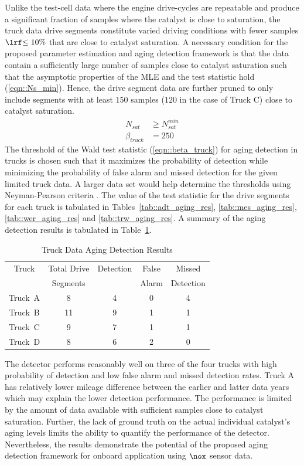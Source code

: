 Unlike the test-cell data where the engine drive-cycles are repeatable and produce a significant fraction of samples where the catalyst is close to saturation, the truck data drive segments constitute varied driving conditions with fewer samples $\lrf{\leq 10\%}$ that are close to catalyst saturation. A necessary condition for the proposed parameter estimation and aging detection framework is that the data contain a sufficiently large number of samples close to catalyst saturation such that the asymptotic properties of the MLE and the test statistic hold (\ref{eqn::Ns_min}). Hence, the drive segment data are further pruned to only include segments with at least $150$ samples ($120$ in the case of Truck C) close to catalyst saturation.
\begin{align}
        N_{sat} &\geq N_{sat}^{min} \label{eqn::Ns_min} \\
        \beta_{truck} &= 250 \label{eqn::beta_truck}
\end{align}
The threshold of the Wald test statistic (\ref{eqn::beta_truck}) for aging detection in trucks is chosen such that it maximizes the probability of detection while minimizing the probability of false alarm and missed detection for the given limited truck data. A larger data set would help determine the thresholds using Neyman-Pearson criteria \citep{kay1998detection}. The value of the test statistic for the drive segments for each truck is tabulated in Tables~\ref{tab::adt_aging_res}, \ref{tab::mes_aging_res}, \ref{tab::wer_aging_res} and \ref{tab::trw_aging_res}. A summary of the aging detection results is tabulated in Table~\ref{tab::truck_aging_summary}.
\begin{table}[ht]
        \centering
        \caption{Truck Data Aging Detection Results}
        \label{tab::truck_aging_summary}
        \begin{tabular}{c c c c c}
        \hline \hline
         Truck & Total Drive & Detection & False  & Missed \\
               & Segments    &         & Alarm & Detection  \\\hline \hline
        Truck~A   & 8  & 4 & 0 & 4 \\
        Truck~B   & 11 & 9 & 1 & 1 \\
        Truck~C   & 9  & 7 & 1 & 1 \\
        Truck~D   & 8  & 6 & 2 & 0 \\
        \hline \hline
        \end{tabular}
\end{table}
The detector performs reasonably well on three of the four trucks with high probability of detection and low false alarm
and missed detection rates. Truck A has relatively lower mileage difference between the earlier and latter data years
which may explain the lower detection performance. The performance is limited by the amount of data available with
sufficient samples close to catalyst saturation. Further, the lack of ground truth on the actual individual catalyst's
aging levels limits the ability to quantify the performance of the detector. Nevertheless, the results demonstrate the
potential of the proposed aging detection framework for onboard application using $\nox$ sensor data.
